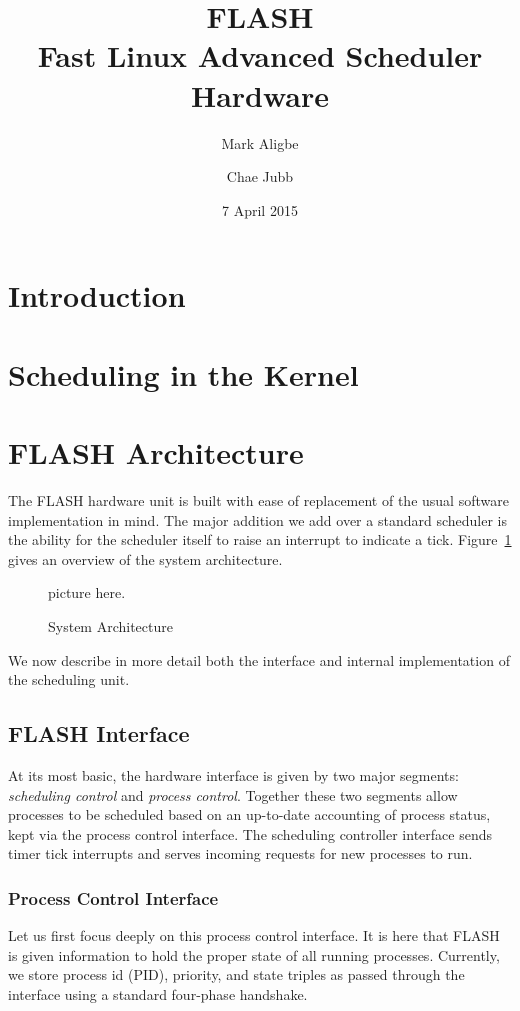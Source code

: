 \documentclass{sig-alternate-10pt}
\title{FLASH\\Fast Linux Advanced Scheduler Hardware}
\author{
	Mark Aligbe \\
	    \email{ma2799@columbia.edu}
	\and
    Chae Jubb \\
        \email{ecj2122@columbia.edu}
}
\date{7 April 2015}
\begin{document}
\maketitle

\begin{abstract}
\lipsum[1]
\end{abstract}


\section{Introduction}
\lipsum[1]

\section{Scheduling in the Kernel}
\lipsum[1]

\section{FLASH Architecture}
The FLASH hardware unit is built with ease of replacement of the usual
software implementation in mind.  The major addition we add over a standard
scheduler is the ability for the scheduler itself to raise an interrupt to
indicate a tick. Figure~\ref{fig:arch_overview} gives an overview of the
system architecture.

\begin{figure}
	\begin{center}
		picture here.
		\caption{System Architecture}
		\label{fig:arch_overview}
	\end{center}
\end{figure}

We now describe in more detail both the interface and
internal implementation of the scheduling unit.

\subsection{FLASH Interface}
At its most basic, the hardware interface is given by two major segments:
\emph{scheduling control} and \emph{process control}.  Together these two
segments allow processes to be scheduled based on an up-to-date accounting
of process status, kept via the process control interface.  The scheduling
controller interface sends timer tick interrupts and serves incoming
requests for new processes to run.

\subsubsection{Process Control Interface}
Let us first focus deeply on this process control interface.  It is here
that FLASH is given information to hold the proper state of all running
processes.  Currently, we store process id (PID), priority, and state
triples as passed through the interface using a standard four-phase
handshake.
\end{document}
